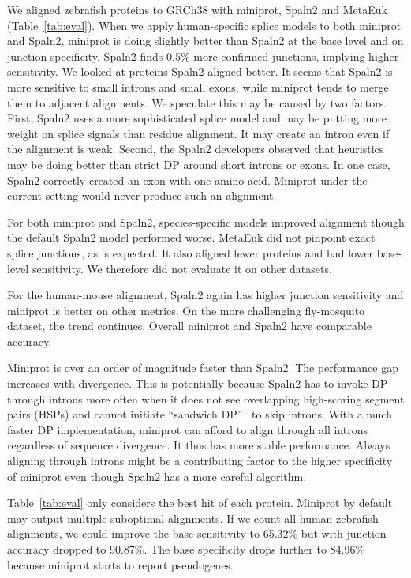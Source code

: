 \documentclass{bioinfo}
\begin{document}
We aligned zebrafish proteins to GRCh38 with miniprot, Spaln2 and MetaEuk
(Table~\ref{tab:eval}). When we apply human-specific splice models to both
miniprot and Spaln2, miniprot is doing slightly better than Spaln2 at the base
level and on junction specificity. Spaln2 finds 0.5\% more confirmed junctions,
implying higher sensitivity. We looked at proteins Spaln2 aligned better. It
seems that Spaln2 is more sensitive to small introns and small exons, while
miniprot tends to merge them to adjacent alignments. We speculate this may be
caused by two factors. First, Spaln2 uses a more sophisticated splice model and
may be putting more weight on splice signals than residue alignment. It may
create an intron even if the alignment is weak. Second, the Spaln2 developers
observed that heuristics may be doing better than strict DP around short
introns or exons. In one case, Spaln2 correctly created an exon with one amino
acid. Miniprot under the current setting would never produce such an alignment.

For both miniprot and Spaln2, species-specific models improved alignment though
the default Spaln2 model performed worse. MetaEuk did not pinpoint exact splice
junctions, as is expected. It also aligned fewer proteins and had lower
base-level sensitivity. We therefore did not evaluate it on other datasets.

For the human-mouse alignment, Spaln2 again has higher junction sensitivity and
miniprot is better on other metrics. On the more challenging fly-mosquito
dataset, the trend continues. Overall miniprot and Spaln2 have comparable
accuracy.

Miniprot is over an order of magnitude faster than Spaln2. The performance gap
increases with divergence. This is potentially because Spaln2 has to invoke DP
through introns more often when it does not see overlapping high-scoring
segment pairs (HSPs) and cannot initiate ``sandwich DP''~\citep{Wu:2005vn} to
skip introns. With a much faster DP implementation, miniprot can afford to
align through all introns regardless of sequence divergence. It thus has more
stable performance. Always aligning through introns might be a contributing
factor to the higher specificity of miniprot even though Spaln2 has a more
careful algorithm.

Table~\ref{tab:eval} only considers the best hit of each protein. Miniprot by
default may output multiple suboptimal alignments. If we count all
human-zebrafish alignments, we could improve the base sensitivity to 65.32\%
but with junction accuracy dropped to 90.87\%. The base specificity drops
further to 84.96\% because miniprot starts to report pseudogenes.
\end{document}
